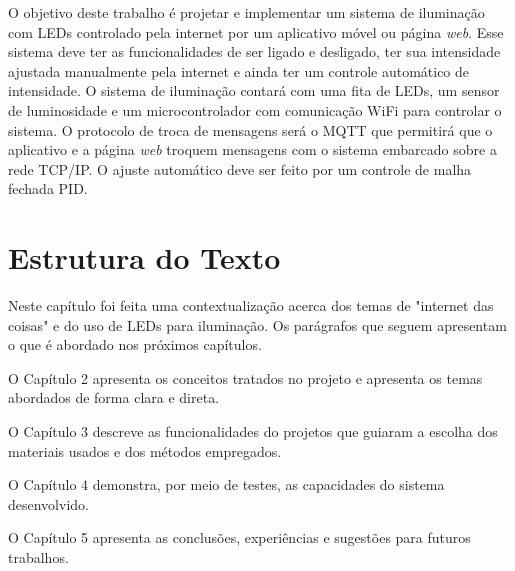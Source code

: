 O objetivo deste trabalho é projetar e implementar um sistema de iluminação com LEDs controlado pela internet por um aplicativo móvel ou página \textit{web}. Esse sistema deve ter as funcionalidades de ser ligado e desligado, ter sua intensidade ajustada manualmente pela internet e ainda ter um controle automático de intensidade. O sistema de iluminação contará com uma fita de LEDs, um sensor de luminosidade e um microcontrolador com comunicação WiFi para controlar o sistema. O protocolo de troca de mensagens será o MQTT que permitirá que o aplicativo e a página \textit{web} troquem mensagens com o sistema embarcado sobre a rede TCP/IP. O ajuste automático deve ser feito por um controle de malha fechada PID.

\section{Estrutura do Texto}

Neste capítulo foi feita uma contextualização acerca dos temas de "internet das coisas" e do uso de LEDs para iluminação. Os parágrafos que seguem apresentam o que é abordado nos próximos capítulos.

O Capítulo 2 apresenta os conceitos tratados no projeto e apresenta os temas abordados de forma clara e direta.

O Capítulo 3 descreve as funcionalidades do projetos que guiaram a escolha dos materiais usados e dos métodos empregados.

O Capítulo 4 demonstra, por meio de testes, as capacidades do sistema desenvolvido.

O Capítulo 5 apresenta as conclusões, experiências e sugestões para futuros trabalhos.